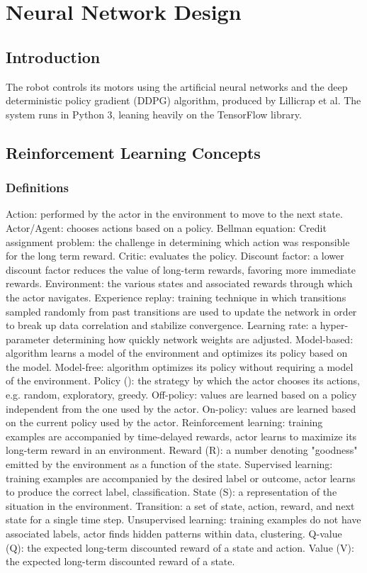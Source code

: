 \chapter{Neural Network Design}
\section{Introduction}
The robot controls its motors using the artificial neural networks and the deep deterministic policy gradient (DDPG) algorithm, produced by Lillicrap et al. The system runs in Python 3, leaning heavily on the TensorFlow library.

\section{Reinforcement Learning Concepts}

\subsection{Definitions \cite{huang_2018}\cite{emami_2016}\cite{matiisen_2015}\cite{bibid}}
Action: performed by the actor in the environment to move to the next state.
Actor/Agent: chooses actions based on a policy.
Bellman equation: 
Credit assignment problem: the challenge in determining which action was responsible for the long term reward.
Critic: evaluates the policy.
Discount factor: a lower discount factor reduces the value of long-term rewards, favoring more immediate rewards.
Environment: the various states and associated rewards through which the actor navigates.
Experience replay: training technique in which transitions sampled randomly from past transitions are used to update the network in order to break up data correlation and stabilize convergence.
Learning rate: a hyper-parameter determining how quickly network weights are adjusted.
Model-based: algorithm learns a model of the environment and optimizes its policy based on the model.
Model-free: algorithm optimizes its policy without requiring a model of the environment.
Policy (\pi): the strategy by which the actor chooses its actions, e.g. random, exploratory, greedy.
Off-policy: values are learned based on a policy independent from the one used by the actor.
On-policy: values are learned based on the current policy used by the actor.
Reinforcement learning: training examples are accompanied by time-delayed rewards, actor learns to maximize its long-term reward in an environment.
Reward (R): a number denoting "goodness" emitted by the environment as a function of the state.
Supervised learning: training examples are accompanied by the desired label or outcome, actor learns to produce the correct label, classification.
State (S): a representation of the situation in the environment.
Transition: a set of state, action, reward, and next state for a single time step.
Unsupervised learning: training examples do not have associated labels, actor finds hidden patterns within data, clustering. 
Q-value (Q): the expected long-term discounted reward of a state and action.
Value (V): the expected long-term discounted reward of a state.

